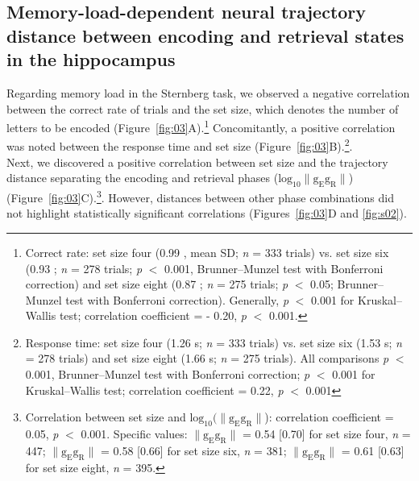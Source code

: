 \documentclass[final,3p,times,twocolumn]{elsarticle}
\begin{document}
\subsection{Memory-load-dependent neural trajectory distance between encoding and retrieval states in the hippocampus}
Regarding memory load in the Sternberg task, we observed a negative correlation between the correct rate of trials and the set size, which denotes the number of letters to be encoded (Figure~\ref{fig:03}A).\footnote{Correct rate: set size four (0.99 , mean \textpm SD; \textit{n} = 333 trials) vs. set size six (0.93 ; \textit{n} = 278 trials; \textit{p} $<$ 0.001, Brunner--Munzel test with Bonferroni correction) and set size eight (0.87 ; \textit{n} = 275 trials; \textit{p} $<$ 0.05; Brunner--Munzel test with Bonferroni correction). Generally, \textit{p} $<$ 0.001 for Kruskal--Wallis test; correlation coefficient = - 0.20, \textit{p} $<$ 0.001.} Concomitantly, a positive correlation was noted between the response time and set size (Figure~\ref{fig:03}B).\footnote{Response time: set size four (1.26  s; \textit{n} = 333 trials) vs. set size six (1.53  s; \textit{n} = 278 trials) and set size eight (1.66  s; \textit{n} = 275 trials). All comparisons \textit{p} $<$ 0.001, Brunner--Munzel test with Bonferroni correction; \textit{p} $<$ 0.001 for Kruskal--Wallis test; correlation coefficient = 0.22, \textit{p} $<$ 0.001}.
\\
\indent
Next, we discovered a positive correlation between set size and the trajectory distance separating the encoding and retrieval phases ($\mathrm{log_{10}\lVert g_{E}g_{R} \rVert}$) (Figure~\ref{fig:03}C).\footnote{Correlation between set size and $\mathrm{log_{10}(\lVert g_{E}g_{R} \rVert}$): correlation coefficient = 0.05, \textit{p} $<$ 0.001. Specific values: $\mathrm{\lVert g_{E}g_{R} \rVert}$ = 0.54 [0.70] for set size four, \textit{n} = 447; $\mathrm{\lVert g_{E}g_{R} \rVert}$ = 0.58 [0.66] for set size six, \textit{n} = 381; $\mathrm{\lVert g_{E}g_{R} \rVert}$ = 0.61 [0.63] for set size eight, \textit{n} = 395.}. However, distances between other phase combinations did not highlight statistically significant correlations (Figures~\ref{fig:03}D and \ref{fig:s02}).
\end{document}
